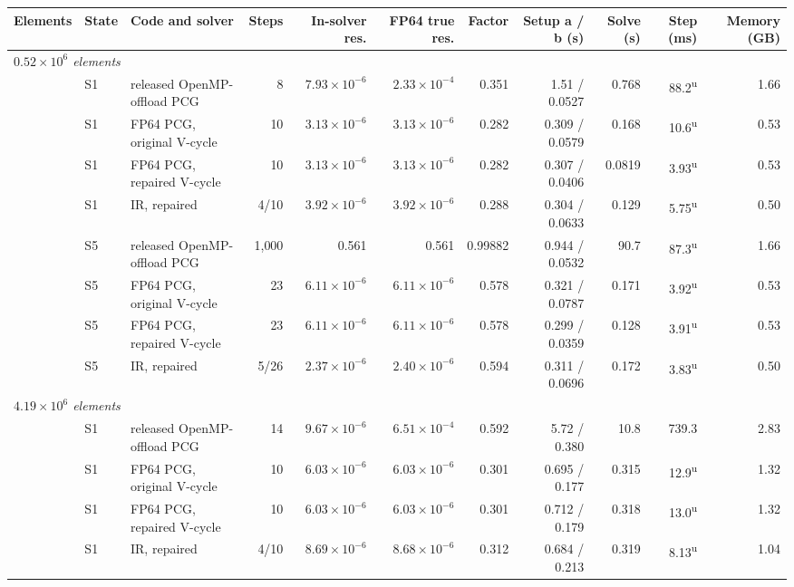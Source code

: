 \begin{tabular}{rllrrrrrrrr}
\toprule
Elements & State & Code and solver & Steps & In-solver res. & FP64 true res. & Factor & Setup a / b (s) & Solve (s) & Step (ms) & Memory (GB) \\
\midrule
\multicolumn{11}{l}{\emph{$0.52\times10^{6}$ elements}} \\
 & S1 & released OpenMP-offload PCG & 8 & $7.93\times10^{-6}$ & $2.33\times10^{-4}$ & 0.351 & 1.51 / 0.0527 & 0.768 & 88.2\textsuperscript{u} & 1.66 \\
 & S1 & FP64 PCG, original V-cycle & 10 & $3.13\times10^{-6}$ & $3.13\times10^{-6}$ & 0.282 & 0.309 / 0.0579 & 0.168 & 10.6\textsuperscript{u} & 0.53 \\
 & S1 & FP64 PCG, repaired V-cycle & 10 & $3.13\times10^{-6}$ & $3.13\times10^{-6}$ & 0.282 & 0.307 / 0.0406 & 0.0819 & 3.93\textsuperscript{u} & 0.53 \\
 & S1 & IR, repaired & 4/10 & $3.92\times10^{-6}$ & $3.92\times10^{-6}$ & 0.288 & 0.304 / 0.0633 & 0.129 & 5.75\textsuperscript{u} & 0.50 \\
 & S5 & released OpenMP-offload PCG & 1{,}000 & 0.561 & 0.561 & 0.99882 & 0.944 / 0.0532 & 90.7 & 87.3\textsuperscript{u} & 1.66 \\
 & S5 & FP64 PCG, original V-cycle & 23 & $6.11\times10^{-6}$ & $6.11\times10^{-6}$ & 0.578 & 0.321 / 0.0787 & 0.171 & 3.92\textsuperscript{u} & 0.53 \\
 & S5 & FP64 PCG, repaired V-cycle & 23 & $6.11\times10^{-6}$ & $6.11\times10^{-6}$ & 0.578 & 0.299 / 0.0359 & 0.128 & 3.91\textsuperscript{u} & 0.53 \\
 & S5 & IR, repaired & 5/26 & $2.37\times10^{-6}$ & $2.40\times10^{-6}$ & 0.594 & 0.311 / 0.0696 & 0.172 & 3.83\textsuperscript{u} & 0.50 \\
\midrule
\multicolumn{11}{l}{\emph{$4.19\times10^{6}$ elements}} \\
 & S1 & released OpenMP-offload PCG & 14 & $9.67\times10^{-6}$ & $6.51\times10^{-4}$ & 0.592 & 5.72 / 0.380 & 10.8 & 739.3 & 2.83 \\
 & S1 & FP64 PCG, original V-cycle & 10 & $6.03\times10^{-6}$ & $6.03\times10^{-6}$ & 0.301 & 0.695 / 0.177 & 0.315 & 12.9\textsuperscript{u} & 1.32 \\
 & S1 & FP64 PCG, repaired V-cycle & 10 & $6.03\times10^{-6}$ & $6.03\times10^{-6}$ & 0.301 & 0.712 / 0.179 & 0.318 & 13.0\textsuperscript{u} & 1.32 \\
 & S1 & IR, repaired & 4/10 & $8.69\times10^{-6}$ & $8.68\times10^{-6}$ & 0.312 & 0.684 / 0.213 & 0.319 & 8.13\textsuperscript{u} & 1.04 \\

\end{tabular}
